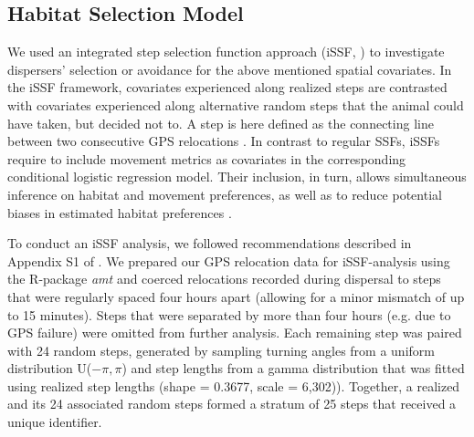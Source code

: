 \documentclass[abstract=on,10pt,a4paper,bibliography=totocnumbered]{scrartcl}
\begin{document}
\subsection{Habitat Selection Model}
\label{Modeling}
We used an integrated step selection function approach (iSSF, \cite{Avgar.2016})
to investigate dispersers' selection or avoidance for the above mentioned
spatial covariates. In the iSSF framework, covariates experienced along realized
steps are contrasted with covariates experienced along alternative random steps
that the animal could have taken, but decided not to. A step is here defined as
the connecting line between two consecutive GPS relocations
\citep{Turchin.1998}. In contrast to regular SSFs, iSSFs require to include
movement metrics as covariates in the corresponding conditional logistic
regression model. Their inclusion, in turn, allows simultaneous inference on
habitat and movement preferences, as well as to reduce potential biases in
estimated habitat preferences \citep{Forester.2009, Warton.2013, Avgar.2016}.

To conduct an iSSF analysis, we followed recommendations described in
Appendix S1 of \cite{Avgar.2016}. We prepared our GPS relocation data for
iSSF-analysis using the R-package \textit{amt} \citep{Amt.2019} and coerced
relocations recorded during dispersal to steps that were regularly spaced four
hours apart (allowing for a minor mismatch of up to 15 minutes). Steps that were
separated by more than four hours (e.g. due to GPS failure) were omitted from
further analysis. Each remaining step was paired with 24 random steps, generated
by sampling turning angles from a uniform distribution U(\(-\pi, \pi\)) and step
lengths from a gamma distribution that was fitted using realized step lengths
(shape = 0.3677, scale = 6,302)). Together, a realized and its 24 associated
random steps formed a stratum of 25 steps that received a unique identifier.
\end{document}
